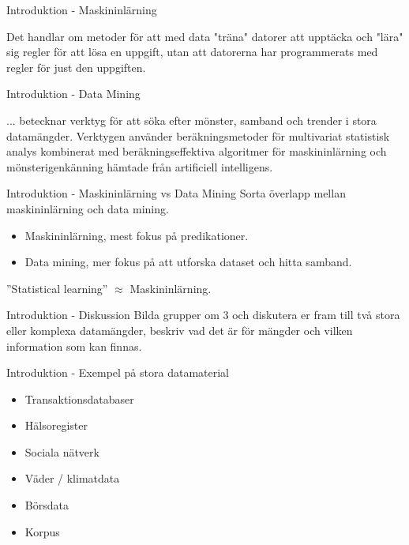 \documentclass[10pt,english]{beamer}
\begin{document}
\begin{frame}{Introduktion - Maskininlärning}
    \begin{bluebox}
        Det handlar om metoder för att med data "träna" datorer att upptäcka och "lära" sig regler för att lösa en uppgift, utan att datorerna har programmerats med regler för just den uppgiften.
    \end{bluebox}
\end{frame}

\begin{frame}{Introduktion - Data Mining}
    \begin{bluebox}
        ... betecknar verktyg för att söka efter mönster, samband och trender i stora datamängder. Verktygen använder beräkningsmetoder för multivariat statistisk analys kombinerat med beräkningseffektiva algoritmer för maskininlärning och mönsterigenkänning hämtade från artificiell intelligens.
    \end{bluebox}
\end{frame}

\begin{frame}{Introduktion - Maskininlärning vs Data Mining}
    Sorta överlapp mellan maskininlärning och data mining.
    \begin{itemize}
        \item Maskininlärning, mest fokus på predikationer.
        \item Data mining, mer fokus på att utforska dataset och hitta samband.
    \end{itemize}
    ''Statistical learning'' $\approx$ Maskininlärning.
\end{frame}

\begin{frame}{Introduktion - Diskussion}
    Bilda grupper om 3 och diskutera er fram till två stora eller komplexa datamängder, beskriv vad det är för mängder och vilken information som kan finnas.
\end{frame}

\begin{frame}{Introduktion - Exempel på stora datamaterial}
    \begin{itemize}
        \item Transaktionsdatabaser
        \item Hälsoregister
        \item Sociala nätverk
        \item Väder / klimatdata
        \item Börsdata
        \item Korpus
    \end{itemize}
\end{frame}
\end{document}
